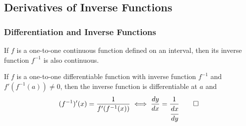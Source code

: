 \subsection{Derivatives of Inverse Functions}
\subsubsection{Differentiation and Inverse Functions}
\begin{theorem}
    If \(f\) is a one-to-one continuous function defined on an interval,
    then its inverse function \(f^{-1}\) is also continuous.
\end{theorem}
\begin{theorem}
    If \(f\) is a one-to-one differentiable function with inverse function
    \(f^{-1}\) and \(f'(f^{-1}(a))\neq 0\), then the inverse function is
    differentiable at \(a\) and
    \[(f^{-1})'(x)=\frac{1}{f'(f^{-1}(x))}\iff\frac{dy}{dx}
    =\frac{1}{\cfrac{dx}{dy}}\qedhere\]
\end{theorem}


